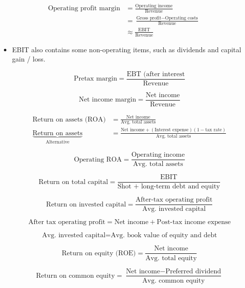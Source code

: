 \documentclass[../notes_compiled.tex]{subfiles}
\begin{document}
\begin{align*}
\text{Operating profit margin} &= \frac{\text{Operating income}}{\text{Revenue}} \\
&=\frac{\text{Gross profit}-\text{Operating costs}}{\text{Revenue}} \\
&\approx \frac{\text{EBIT}}{\text{Revenue}}
\end{align*}
\begin{itemize}
\item EBIT also contains some non-operating items, such as dividends and capital gain / loss.

\begin{equation*}
\text{Pretax margin} = \frac{\text{EBT (after interest}}{\text{Revenue}}
\end{equation*}

\begin{equation*}
\text{Net income margin} = \frac{\text{Net income}}{\text{Revenue}}
\end{equation*}

\begin{align*}
\text{Return on assets (ROA)} &= \frac{\text{Net income}}{\text{Avg. total assets}} \\
\underbrace{\text{Return on assets}}_{\text{Alternative}}&=\frac{\text{Net income} + (\text{Interest expense})(1-\text{tax rate})}{\text{Avg. total assets}}
\end{align*}

\begin{equation*}
\text{Operating ROA} = \frac{\text{Operating income}}{\text{Avg. total assets}}
\end{equation*}

\begin{equation*}
\text{Return on total capital} = \frac{\text{EBIT}}{\text{Shot + long-term debt and equity}}
\end{equation*}

\begin{equation*}
\text{Return on invested capital} = \frac{\text{After-tax operating profit}}{\text{Avg. invested capital}}
\end{equation*}

\begin{equation*}
\text{After tax operating profit} = \text{Net income} + \text{Post-tax income expense}
\end{equation*}

\begin{equation*}
\text{Avg. invested capital} = \text{Avg. book value of equity and debt}
\end{equation*}

\begin{equation*}
\text{Return on equity (ROE)} = \frac{\text{Net income}}{\text{Avg. total equity}}
\end{equation*}

\begin{equation*}
\text{Return on common equity} = \frac{\text{Net income} - \text{Preferred dividend}}{\text{Avg. common equity}}
\end{equation*}

\end{itemize}
\end{document}
